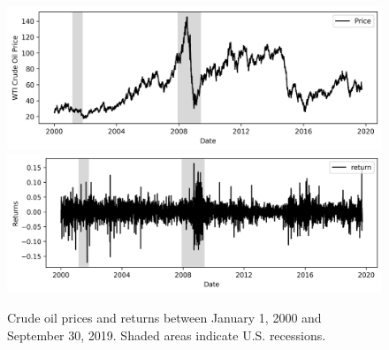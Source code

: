 \documentclass[12pt]{article}
\begin{document}
	\begin{figure}[H]
		\small
		\centering
		\includegraphics[width=\linewidth]{figures/wti_summary/prices.png}
		\includegraphics[width=\linewidth]{figures/wti_summary/returns.png}
		\caption{Crude oil prices and returns between January 1, 2000 and September 30, 2019. Shaded areas indicate U.S. recessions.}
	\end{figure}
\end{document}
